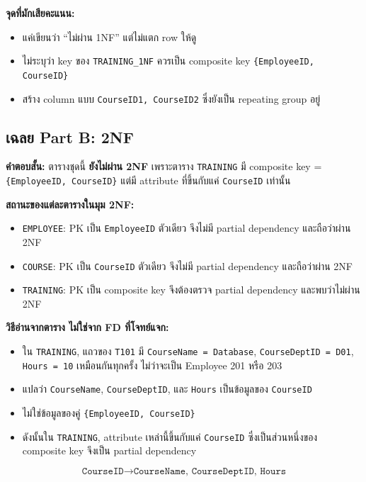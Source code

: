 \documentclass[a4paper,12pt]{article}
\newcommand{\schema}[1]{\texttt{#1}}
\begin{document}
\textbf{จุดที่มักเสียคะแนน:}
\begin{itemize}
    \item แค่เขียนว่า ``ไม่ผ่าน 1NF'' แต่ไม่แตก row ให้ดู
    \item ไม่ระบุว่า key ของ \schema{TRAINING\_1NF} ควรเป็น composite key \schema{\{EmployeeID, CourseID\}}
    \item สร้าง column แบบ \schema{CourseID1, CourseID2} ซึ่งยังเป็น repeating group อยู่
\end{itemize}

\newpage
\subsection*{เฉลย Part B: 2NF}
\textbf{คำตอบสั้น:} ตารางชุดนี้ \textbf{ยังไม่ผ่าน 2NF} เพราะตาราง \schema{TRAINING} มี composite key = \schema{\{EmployeeID, CourseID\}} แต่มี attribute ที่ขึ้นกับแค่ \schema{CourseID} เท่านั้น

\textbf{สถานะของแต่ละตารางในมุม 2NF:}
\begin{itemize}
    \item \schema{EMPLOYEE}: PK เป็น \schema{EmployeeID} ตัวเดียว จึงไม่มี partial dependency และถือว่าผ่าน 2NF
    \item \schema{COURSE}: PK เป็น \schema{CourseID} ตัวเดียว จึงไม่มี partial dependency และถือว่าผ่าน 2NF
    \item \schema{TRAINING}: PK เป็น composite key จึงต้องตรวจ partial dependency และพบว่าไม่ผ่าน 2NF
\end{itemize}

\textbf{วิธีอ่านจากตาราง ไม่ใช่จาก FD ที่โจทย์แจก:}
\begin{itemize}
    \item ใน \schema{TRAINING}, แถวของ \schema{T101} มี \schema{CourseName = Database}, \schema{CourseDeptID = D01}, \schema{Hours = 10} เหมือนกันทุกครั้ง ไม่ว่าจะเป็น Employee 201 หรือ 203
    \item แปลว่า \schema{CourseName}, \schema{CourseDeptID}, และ \schema{Hours} เป็นข้อมูลของ \schema{CourseID}
    \item ไม่ใช่ข้อมูลของคู่ \schema{\{EmployeeID, CourseID\}}
    \item ดังนั้นใน \schema{TRAINING}, attribute เหล่านี้ขึ้นกับแค่ \schema{CourseID} ซึ่งเป็นส่วนหนึ่งของ composite key จึงเป็น partial dependency
\end{itemize}

\[
\schema{CourseID} \rightarrow \schema{CourseName, CourseDeptID, Hours}
\]
\end{document}
